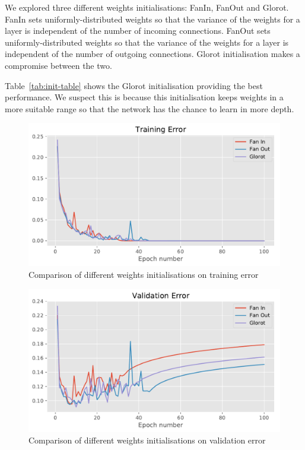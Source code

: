 \documentclass{article}
\begin{document}
We explored three different weights initialisations: FanIn, FanOut and Glorot. FanIn sets uniformly-distributed weights so that the variance of the weights for a layer is independent of the number of incoming connections. FanOut sets uniformly-distributed weights so that the variance of the weights for a layer is independent of the number of outgoing connections. Glorot initialisation makes a compromise between the two.

Table~\ref{tab:init-table} shows the Glorot initialisation providing the best performance. We suspect this is because this initialisation keeps weights in a more suitable range so that the network has the chance to learn in more depth. 
\begin{figure}[tb]
\vskip 5mm
\begin{center}
\centerline{\includegraphics[width=\columnwidth]{init_tr_error}}
\caption{Comparison of different weights initialisations on training error}
\label{fig:init-tr-err}
\end{center}
\vskip -5mm
\end{figure} 

\begin{figure}[tb]
\vskip 5mm
\begin{center}
\centerline{\includegraphics[width=\columnwidth]{init_error}}
\caption{Comparison of different weights initialisations on validation error}
\label{fig:init-val-err}
\end{center}
\vskip -5mm
\end{figure} 
\end{document}
